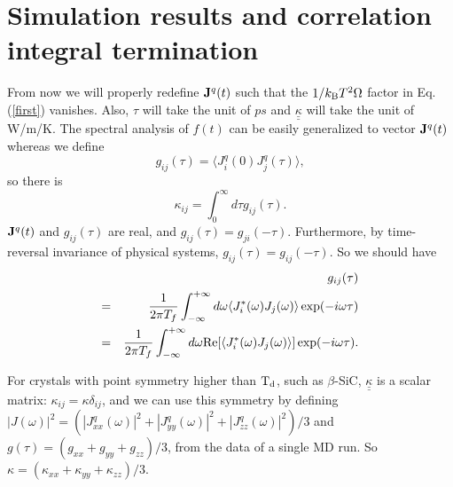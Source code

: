 \section{Simulation results and correlation integral termination}
\label{sec:termination}

From now we will properly redefine ${\bf J}^q(t)$ such that the $1 /
k_{\rm B}T^2\Omega$ factor in Eq. (\ref{first}) vanishes.  Also,
$\tau$ will take the unit of $ps$ and $\underline{\underline{\kappa}}$
will take the unit of W/m/K. The spectral analysis of $f(t)$ can be
easily generalized to vector ${\bf J}^q(t)$ whereas we define
\begin{equation}
g_{ij}(\tau) = \langle J^q_i(0) J^q_j(\tau) \rangle,
\end{equation}
so there is
\begin{equation}
\kappa_{ij} = \int_{0}^{\infty}d\tau g_{ij}(\tau).
\end{equation}
${\bf J}^q(t)$ and $g_{ij}(\tau)$ are real, and $g_{ij}(\tau) =
g_{ji}(-\tau)$.  Furthermore, by time-reversal invariance of physical
systems, $g_{ij}(\tau) = g_{ij}(-\tau)$. So we should have
\begin{eqnarray} 
&& g_{ij}(\tau) \nonumber \\
=&& \frac{1}{2\pi T_{f}} \int^{+\infty}_{-\infty} 
d\omega \langle J_i^*(\omega) J_j(\omega) \rangle 
\exp (-i\omega \tau) \nonumber \\
=&& \frac{1}{2\pi T_{f}} \int^{+\infty}_{-\infty} 
d\omega {\rm Re} [\langle  J_i^*(\omega) J_j(\omega) \rangle]
\exp (-i\omega \tau).
\label{Gij}
\end{eqnarray}

For crystals with point symmetry higher than ${\rm T}_{\rm d}$, such
as $\beta$-SiC, $\underline{\underline{\kappa}}$ is a scalar matrix:
$\kappa_{ij} = \kappa \delta_{ij}$, and we can use this symmetry by
defining $|J(\omega)|^2 = (|J^q_{xx}(\omega)|^2 + |J^q_{yy}(\omega)|^2
+ |J^q_{zz}(\omega)|^2)/3$ and $g(\tau) = (g_{xx} + g_{yy} +
g_{zz})/3$, from the data of a single MD run.  So $\kappa =
(\kappa_{xx} + \kappa_{yy} + \kappa_{zz})/3$.

